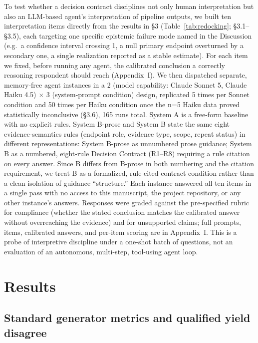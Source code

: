 \documentclass{article}
\begin{document}
To test whether a decision contract disciplines not only human interpretation but also an LLM-based agent's interpretation of pipeline outputs, we built ten interpretation items directly from the results in \S3 (Table~\ref{tab:redocking}; \S3.1--\S3.5), each targeting one specific epistemic failure mode named in the Discussion (e.g.\ a confidence interval crossing 1, a null primary endpoint overturned by a secondary one, a single realization reported as a stable estimate). For each item we fixed, before running any agent, the calibrated conclusion a correctly reasoning respondent should reach (Appendix~I). We then dispatched separate, memory-free agent instances in a 2 (model capability: Claude Sonnet 5, Claude Haiku 4.5) $\times$ 3 (system-prompt condition) design, replicated 5 times per Sonnet condition and 50 times per Haiku condition once the n=5 Haiku data proved statistically inconclusive (\S3.6), 165 runs total. System A is a free-form baseline with no explicit rules. System B-prose and System B state the same eight evidence-semantics rules (endpoint role, evidence type, scope, repeat status) in different representations: System B-prose as unnumbered prose guidance; System B as a numbered, eight-rule Decision Contract (R1--R8) requiring a rule citation on every answer. Since B differs from B-prose in both numbering and the citation requirement, we treat B as a formalized, rule-cited contract condition rather than a clean isolation of guidance ``structure.'' Each instance answered all ten items in a single pass with no access to this manuscript, the project repository, or any other instance's answers. Responses were graded against the pre-specified rubric for compliance (whether the stated conclusion matches the calibrated answer without overreaching the evidence) and for unsupported claims; full prompts, items, calibrated answers, and per-item scoring are in Appendix~I. This is a probe of interpretive discipline under a one-shot batch of questions, not an evaluation of an autonomous, multi-step, tool-using agent loop.

\section{Results}

\subsection{Standard generator metrics and qualified yield disagree}
\end{document}
